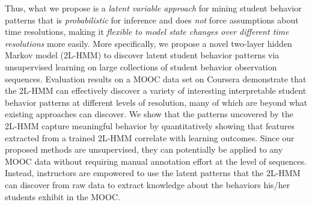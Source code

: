 Thus, what we propose is a \emph{latent variable approach} for mining student behavior
patterns that is \emph{probabilistic} for inference and
does \emph{not} force assumptions about time resolutions, making it
\emph{flexible to model state changes over different time resolutions} more
easily.  More specifically, we propose a novel two-layer hidden Markov
model (2L-HMM) to discover latent student behavior patterns via
unsupervised learning on large collections of student behavior observation
sequences.  Evaluation results on a MOOC data set on Coursera demonstrate
that the 2L-HMM can effectively discover a variety of interesting interpretable
student behavior patterns at different levels of resolution, many of which
are beyond what existing approaches can discover. We show that the patterns
uncovered by the 2L-HMM capture meaningful behavior by quantitatively
showing that features extracted from a trained 2L-HMM correlate with
learning outcomes. Since our proposed methods are
unsupervised, they can potentially be applied to any MOOC data without
requiring manual annotation effort at the level of sequences. Instead,
instructors are empowered to use the latent patterns that the 2L-HMM can
discover from raw data to extract knowledge about the behaviors his/her
students exhibit in the MOOC.

